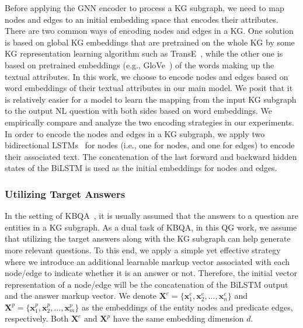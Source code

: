 \documentclass[journal]{IEEEtran}
\let\vec\mathbf
\begin{document}
Before applying the GNN encoder to process a KG subgraph, 
we need to map nodes and edges to an initial embedding space that encodes their attributes.
There are two common ways of encoding nodes and edges in a KG.
One solution is based on global KG embeddings that are pretrained on the whole KG by some 
KG representation learning algorithm such as TransE~\cite{bordes2013translating},
while the other one is based on pretrained embeddings (e.g., GloVe~\cite{pennington2014glove}) of the words making up the textual attributes.
In this work, we choose to encode nodes and edges based on word embeddings of their textual attributes in our main model.
We posit that it is relatively easier for a model to learn the mapping from the input KG subgraph to the output NL question with both sides based on word embeddings.
We empirically compare and analyze the two encoding strategies in our experiments.
In order to encode the nodes and edges in a KG subgraph,
we apply two bidirectional LSTMs~\cite{hochreiter1997long} 
for nodes 
(i.e., one for nodes, and one for edges) to encode their associated text.
The concatenation of the last forward and backward hidden states of the BiLSTM is used as the initial embeddings for nodes and edges.






\subsubsection{Utilizing Target Answers}

In the setting of KBQA~\cite{chen2019bidirectional,haussmann2019foodkg}, it is usually assumed that the answers to a question are entities in a KG subgraph. 
As a dual task of KBQA, in this QG work, 
we assume that utilizing the target answers along with the KG subgraph can help generate more relevant questions.
To this end, we apply a simple yet effective strategy 
where we introduce an additional learnable markup vector associated with each node/edge to indicate whether it is an answer or not.
Therefore, the initial vector representation of a node/edge will be the concatenation of the BiLSTM output and the answer markup vector.
We denote $\vec{X}^e=\{\vec{x}^e_1, \vec{x}^e_2, ..., \vec{x}^e_n\}$ and $\vec{X}^p=\{\vec{x}^p_1, \vec{x}^p_2, ..., \vec{x}^p_m\}$ as the embeddings of the entity nodes and predicate edges, respectively.
Both $\vec{X}^e$ and $\vec{X}^p$ have the same embedding dimension $d$.
\end{document}
